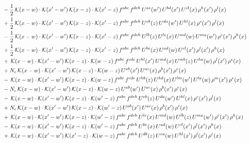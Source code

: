 \documentclass[9pt]{article}
\numberwithin{equation}{section}
\begin{document}
\begin{align}
& -\frac{1}{2}\,\mathcal{K}(x-w)\cdot\mathcal{K}(x'-w')\,\mathcal{K}(x-z)\cdot\mathcal{K}(x'-z)\,f^{abc}\,f^{deh}\,U^{ae}(w')\,U^{bd}(x')\,U^{cl}(x)\,\rho^{h}(x')\,\rho^{l}(x)\notag\\
& +\frac{1}{2}\,\mathcal{K}(x-w)\cdot\mathcal{K}(x'-w')\,\mathcal{K}(x-z)\cdot\mathcal{K}(x'-z)\,f^{abc}\,f^{deh}\,U^{eb}(z)\,U^{da}(w')\,U^{hl}(x)\,\rho^{c}(x')\,\rho^{l}(x)\notag\\
& -\frac{1}{2}\,\mathcal{K}(x-w)\cdot\mathcal{K}(x'-w')\,\mathcal{K}(x-z)\cdot\mathcal{K}(x'-z)\,f^{abc}\,f^{deh}\,U^{lb}(z)\,U^{le}(x)\,U^{md}(w)\,U^{ma}(w')\,\rho^{c}(x')\,\rho^{h}(x)\notag\\
& +\frac{1}{2}\,\mathcal{K}(x-w)\cdot\mathcal{K}(x'-w')\,\mathcal{K}(x-z)\cdot\mathcal{K}(x'-z)\,f^{abc}\,f^{deh}\,U^{be}(x)\,U^{ad}(w)\,U^{cl}(x')\,\rho^{l}(x')\,\rho^{h}(x)\notag\\
& +\,\mathcal{K}(x-w)\cdot\mathcal{K}(x'-w')\,\mathcal{K}(x-z)\cdot\mathcal{K}(w-z)\,f^{abc}\,f^{cde}\,U^{hl}(x')\,U^{md}(x)\,U^{mb}(z)\,U^{ha}(w)\,\rho^{l}(x')\,\rho^{e}(x)\notag\\
& +N_{c}\,\mathcal{K}(x-w)\cdot\mathcal{K}(x'-w')\,\mathcal{K}(x-z)\cdot\mathcal{K}(w-z)\,U^{ab}(x')\,U^{ac}(x)\,\rho^{b}(x')\,\rho^{c}(x)\notag\\
& -\,\mathcal{K}(x-w)\cdot\mathcal{K}(x'-w')\,\mathcal{K}(x-z)\cdot\mathcal{K}(w-z)\,f^{abc}\,f^{cde}\,U^{hb}(z)\,U^{hd}(x)\,U^{lm}(w')\,U^{la}(w)\,\rho^{m}(x')\,\rho^{e}(x)\notag\\
& -N_{c}\,\mathcal{K}(x-w)\cdot\mathcal{K}(x'-w')\,\mathcal{K}(x-z)\cdot\mathcal{K}(w-z)\,U^{ab}(w')\,U^{ac}(x)\,\rho^{b}(x')\,\rho^{c}(x)\notag\\
& -\,\mathcal{K}(x-w)\cdot\mathcal{K}(x'-w')\,\mathcal{K}(x-z)\cdot\mathcal{K}(w'-z)\,f^{abc}\,f^{deh}\,U^{eb}(z)\,U^{da}(w')\,U^{hl}(x)\,\rho^{c}(x')\,\rho^{l}(x)\notag\\
& +N_{c}\,\mathcal{K}(x-w)\cdot\mathcal{K}(x'-w')\,\mathcal{K}(x-z)\cdot\mathcal{K}(w'-z)\,U^{ab}(x')\,U^{ac}(x)\,\rho^{b}(x')\,\rho^{c}(x)\notag\\
& +\,\mathcal{K}(x-w)\cdot\mathcal{K}(x'-w')\,\mathcal{K}(x-z)\cdot\mathcal{K}(w'-z)\,f^{abc}\,f^{deh}\,U^{le}(x)\,U^{md}(w)\,U^{lb}(z)\,U^{ma}(w')\,\rho^{c}(x')\,\rho^{h}(x)\notag\\
& -\,\mathcal{K}(x-w)\cdot\mathcal{K}(x'-w')\,\mathcal{K}(x-z)\cdot\mathcal{K}(w'-z)\,f^{abc}\,f^{deh}\,U^{be}(x)\,U^{ad}(w)\,U^{cl}(x')\,\rho^{l}(x')\,\rho^{h}(x)\notag\\
& +\,\mathcal{K}(x-w)\cdot\mathcal{K}(x'-w')\,\mathcal{K}(x'-z)\cdot\mathcal{K}(w-z)\,f^{abc}\,f^{deh}\,U^{db}(z)\,U^{ea}(w)\,U^{hl}(x')\,\rho^{l}(x')\,\rho^{c}(x)\notag\\

\end{align}
\end{document}
